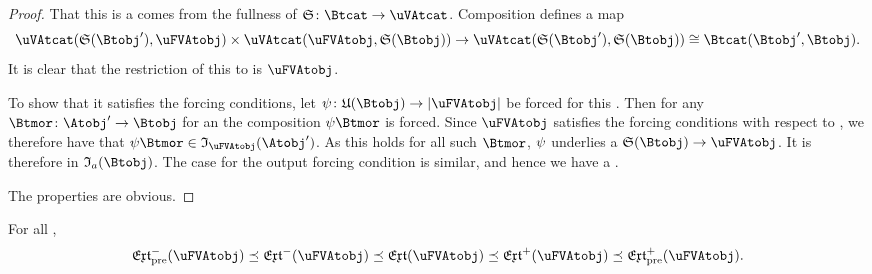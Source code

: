 \documentclass[%
a4paper,%
arxiv,%
defaults
]{myclass}
\begin{document}
\begin{proof}
That this is a \uVBtobj comes from the fullness of \(\sfunc \colon \Btcat \to \uVAtcat\).
Composition defines a map
%
\[
  \Hom{\uVAtcat}{\sfunc(\Btobj')}{\uFVAtobj} \times   \Hom{\uVAtcat}{\uFVAtobj}{\sfunc(\Btobj)} \to \Hom{\uVAtcat}{\sfunc(\Btobj')}{\sfunc(\Btobj)} \cong \Hom{\Btcat}{\Btobj'}{\Btobj}.
\]
%
It is clear that the restriction of this to \Atcat is \(\uFVAtobj\).

To show that it satisfies the forcing conditions, let \(\ifn \colon \ufunc(\Btobj) \to \forfunc[\uFVAtobj]\) be forced for this \uVBtobjalt.
Then for any \Btmor \(\Btmor \colon \Atobj' \to \Btobj\) for an \Atobj[\Atobj'] the composition \(\ifn \Btmor\) is forced.
Since \(\uFVAtobj\) satisfies the forcing conditions with respect to \Atcat, we therefore have that \(\ifn \Btmor \in \itest_{\uFVAtobj}(\Atobj')\).
As this holds for all such \(\Btmor\), \(\psi\) underlies a \uVAtmor \(\sfunc(\Btobj) \to \uFVAtobj\).
It is therefore in \(\itest_a(\Btobj)\).
The case for the output forcing condition is similar, and hence we have a \uFVBtobjalt.

The properties are obvious.
\end{proof}


\begin{lemma}
For all \uFVAtobjs[\uFVAtobj],
%
\[
  \PMextfunc(\uFVAtobj) \preceq \Mextfunc(\uFVAtobj) \preceq \extfunc(\uFVAtobj) \preceq \Jextfunc(\uFVAtobj) \preceq \PJextfunc(\uFVAtobj).
\]
\end{lemma}
\end{document}

